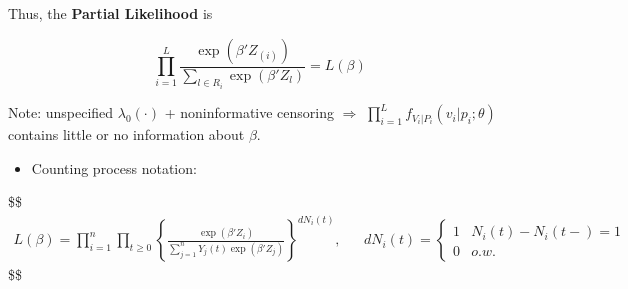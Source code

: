\documentclass[
]{book}
\providecommand{\tightlist}{%
  \setlength{\itemsep}{0pt}\setlength{\parskip}{0pt}}
\theoremstyle{definition}
\theoremstyle{definition}
\theoremstyle{definition}
\theoremstyle{definition}
\theoremstyle{remark}
\begin{document}
Thus, the \textbf{Partial Likelihood} is

\[
\prod^L_{i=1}\frac{\exp(\beta ' Z_{(i)})}{\sum\limits_{l\in R_i} \exp(\beta ' Z_{l})} = L(\beta)\tag{3}
\]

Note: unspecified \(\lambda_0(\cdot)\) + noninformative censoring \(\Rightarrow\) \(\prod\limits_{i=1}^L f_{V_i \big | P_i} (v_i \Big | p_i ; \theta)\) contains little or no information about \(\beta\).

\begin{itemize}
\tightlist
\item
  Counting process notation:
\end{itemize}

\$\$
\begin{align}
L(\beta) = \prod^n_{i=1}\prod_{t\ge0} \left \{ 

\frac{\exp(\beta ' Z_{i})}{\sum\limits_{j=1}^n Y_j(t) \exp(\beta ' Z_{j})}

\right\}^{dN_i(t)}


, && dN_i(t) = \begin{cases} 1 & N_i(t) - N_i {(t-)} =1\\0 & o.w.\end{cases}

\end{align}
\$\$
\end{document}
